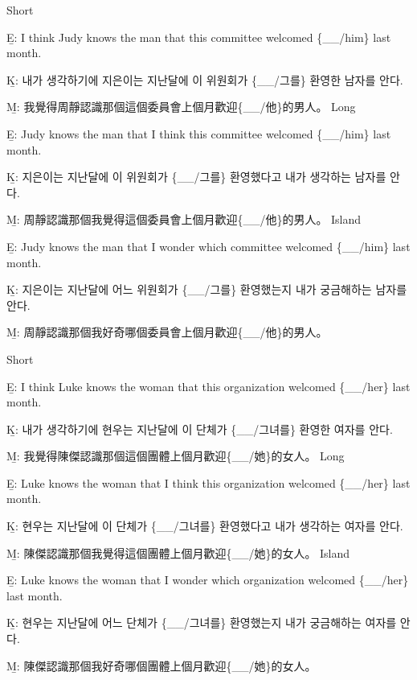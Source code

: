 \pex %
\a Short\par\nobreak
\beginsubsub
\b{E:} I think Judy knows the man that this committee welcomed \{\_\_/him\} last month.\par\nobreak
\b{K:} \ko 내가 생각하기에 지은이는 지난달에 이 위원회가 \{\_\_/그를\} 환영한 남자를 안다. \normalfont\par\nobreak
\b{M:} \zh 我覺得周靜認識那個這個委員會上個月歡迎\{\_\_/他\}的男人。 \normalfont
\endsubsub
\a Long\par\nobreak
\beginsubsub
\b{E:} Judy knows the man that I think this committee welcomed \{\_\_/him\} last month.\par\nobreak
\b{K:} \ko 지은이는 지난달에 이 위원회가 \{\_\_/그를\} 환영했다고 내가 생각하는 남자를 안다. \normalfont\par\nobreak
\b{M:} \zh 周靜認識那個我覺得這個委員會上個月歡迎\{\_\_/他\}的男人。 \normalfont
\endsubsub
\a Island\par\nobreak
\beginsubsub
\b{E:} Judy knows the man that I wonder which committee welcomed \{\_\_/him\} last month.\par\nobreak
\b{K:} \ko 지은이는 지난달에 어느 위원회가 \{\_\_/그를\} 환영했는지 내가 궁금해하는 남자를 안다\normalfont.\par\nobreak
\b{M:} \zh 周靜認識那個我好奇哪個委員會上個月歡迎\{\_\_/他\}的男人。\normalfont
\endsubsub
\xe

\pex %
\a Short\par\nobreak
\beginsubsub
\b{E:} I think Luke knows the woman that this organization welcomed \{\_\_/her\} last month.\par\nobreak
\b{K:} \ko 내가 생각하기에 현우는 지난달에 이 단체가 \{\_\_/그녀를\} 환영한 여자를 안다. \normalfont\par\nobreak
\b{M:} \zh 我覺得陳傑認識那個這個團體上個月歡迎\{\_\_/她\}的女人。 \normalfont
\endsubsub
\a Long\par\nobreak
\beginsubsub
\b{E:} Luke knows the woman that I think this organization welcomed \{\_\_/her\} last month.\par\nobreak
\b{K:} \ko 현우는 지난달에 이 단체가 \{\_\_/그녀를\} 환영했다고 내가 생각하는 여자를 안다. \normalfont\par\nobreak
\b{M:} \zh 陳傑認識那個我覺得這個團體上個月歡迎\{\_\_/她\}的女人。 \normalfont
\endsubsub
\a Island\par\nobreak
\beginsubsub
\b{E:} Luke knows the woman that I wonder which organization welcomed \{\_\_/her\} last month.\par\nobreak
\b{K:} \ko 현우는 지난달에 어느 단체가 \{\_\_/그녀를\} 환영했는지 내가 궁금해하는 여자를 안다\normalfont.\par\nobreak
\b{M:} \zh 陳傑認識那個我好奇哪個團體上個月歡迎\{\_\_/她\}的女人。\normalfont
\endsubsub
\xe

